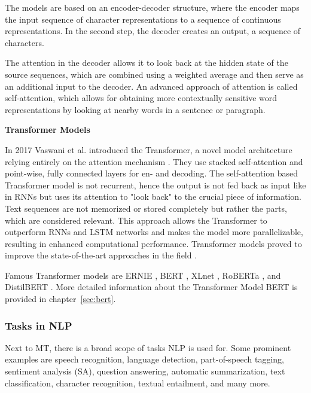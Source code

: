 The models are based on an encoder-decoder structure, where the encoder maps the input sequence of character representations to a sequence of continuous representations. In the second step, the decoder creates an output, a sequence of characters. 

The attention in the decoder allows it to look back at the hidden state of the source sequences, which are combined using a weighted average and then serve as an additional input to the decoder. 
An advanced approach of attention is called self-attention, which allows for obtaining more contextually sensitive word representations by looking at nearby words in a sentence or paragraph.

\textbf{Transformer Models}
\label{sec:transformers}

In 2017 Vaswani et al. introduced the Transformer, a novel model architecture relying entirely on the attention mechanism \cite{vaswani2017attention}. They use stacked self-attention and point-wise, fully connected layers for en- and decoding. 
The self-attention based Transformer model is not recurrent, hence the output is not fed back as input like in RNNs but uses its attention to "look back" to the crucial piece of information. Text sequences are not memorized or stored completely but rather the parts, which are considered relevant. This approach allows the Transformer to outperform RNNs and LSTM networks and makes the model more parallelizable, resulting in enhanced computational performance. Transformer models proved to improve the state-of-the-art approaches in the field \cite{vaswani2017attention}. 

Famous Transformer models are ERNIE \cite{zhang2019ernie}, BERT \cite{devlin2018bert}, XLnet \cite{yang2019xlnet}, RoBERTa \cite{liu2019roberta}, and DistilBERT \cite{sanh2019distilbert}. More detailed information about the Transformer Model BERT is provided in chapter~\ref{sec:bert}.

\subsubsection{Tasks in NLP}
\label{sec:tasks_in_nLP}

Next to MT, there is a broad scope of tasks NLP is used for. Some prominent examples are speech recognition, language detection, part-of-speech tagging, sentiment analysis (SA), question answering, automatic summarization, text classification, character recognition, textual entailment, and many more.

